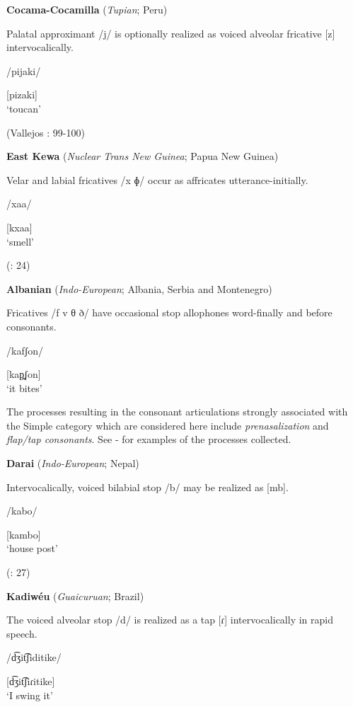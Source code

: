 \ea\label{ex:7.9}
  \textbf{Cocama-Cocamilla} (\textit{Tupian}; Peru)

Palatal approximant /j/ is optionally realized as voiced alveolar fricative [z] intervocalically.

/pijaki/

[pizaki]\\
\glt ‘toucan’

(Vallejos \citealt{Yopán2010}: 99-100)
\z

\ea\label{ex:7.10}
  \textbf{East Kewa} (\textit{Nuclear Trans New Guinea}; Papua New Guinea)

Velar and labial fricatives /x ɸ/ occur as affricates utterance-initially.

/xaa/

[kxaa]\\
\glt ‘smell’

(\citealt{FranklinFranklin1978}: 24)
\z

\ea\label{ex:7.11}
  \textbf{Albanian} (\textit{Indo-European}; Albania, Serbia and Montenegro)

Fricatives /f v θ ð/ have occasional stop allophones word-finally and before consonants.

/kafʃon/

[kap̪ʃon]\\
\glt ‘it bites’
\citep[16]{Newmark1957}
\z

  The processes resulting in the consonant articulations strongly associated with the Simple category which are considered here include \textit{prenasalization} and \textit{flap/tap consonants}. See - for examples of the processes collected.

\ea\label{ex:7.12}
  \textbf{Darai} (\textit{Indo-European}; Nepal)

Intervocalically, voiced bilabial stop /b/ may be realized as [mb].

/kabo/

[kambo]\\
\glt ‘house post’

(\citealt{KotapishKotapish1973}: 27)
\z

\ea\label{ex:7.13}
  \textbf{Kadiwéu} (\textit{Guaicuruan}; Brazil)

The voiced alveolar stop /d/ is realized as a tap [ɾ] intervocalically in rapid speech.

/d͡ʒit͡ʃiditike/

[d͡ʒit͡ʃiɾitike]\\
\glt ‘I swing it’
\citep[16]{Sandalo1997}
\z

